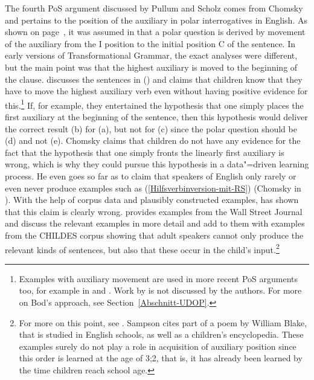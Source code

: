 The fourth PoS argument discussed by Pullum and Scholz comes from Chomsky and pertains to the
position of the auxiliary in polar interrogatives in English. As shown on page~\pageref{Seite-GB-Entscheidungsfragen-Englisch},
it was assumed in \gbt that a polar question is derived by movement of the auxiliary from the I position to the initial position C of
the sentence. In early versions of Transformational Grammar, the exact analyses were different, but the main point was that the
highest auxiliary is moved to the beginning of the clause. 
 \citet[--33]{Chomsky71a-u}
discusses the sentences in () and claims that children know that they have to move the highest auxiliary verb even without having
positive evidence for this.\footnote{
	Examples with auxiliary movement are used in more recent PoS arguments too, for example in 
   and . Work by \citet{Bod2009a} is not discussed by the authors.
  For more on Bod's approach, see Section~\ref{Abschnitt-UDOP}.%
} If, for example, they entertained the hypothesis that one simply places the first auxiliary at the beginning of the sentence, then
this hypothesis would deliver the correct result (b) for (a), but not for (c) since the polar question should
be (d) and not (e).
\eal
{}
\zl
Chomsky claims that children do not have any evidence for the fact that the hypothesis that one
simply fronts the linearly first auxiliary is wrong, which is why they could pursue this hypothesis in a data"=driven learning process. He even goes so
far as to claim that speakers of English only rarely or even never produce examples such as (\ref{Hilfsverbinversion-mit-RS})
(Chomsky in
). 
With the help of corpus data and plausibly constructed examples, \citet{Pullum96a} has shown that this claim is clearly wrong.
 \citet{Pullum96a} provides examples from the Wall Street Journal and \citet{PS2002a} discuss the relevant examples in more detail
 and add to them with examples from the CHILDES corpus showing  that adult speakers cannot only produce the relevant
 kinds of sentences, but also that these occur in the child's input.\footnote{
For more on this point, see . Sampson cites part of a poem by William Blake, that is studied in English schools, as well as
a children's encyclopedia. These examples surely do not play a role in acquisition of auxiliary position since this order is learned at the age of
3;2, that is, it has already been learned by the time children reach school age.%
}
